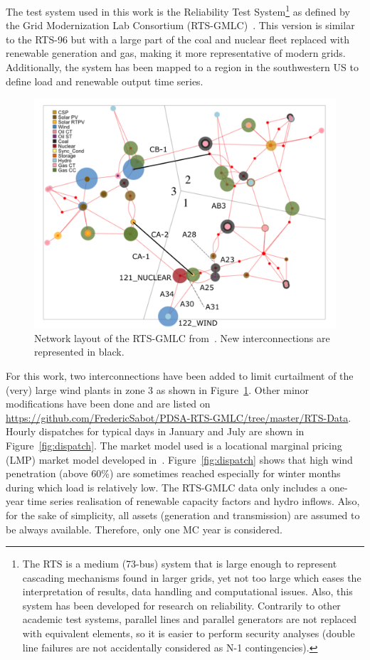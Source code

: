 The test system used in this work is the Reliability Test System\footnote{The RTS is a medium (73-bus) system that is large enough to represent cascading mechanisms found in larger grids, yet not too large which eases the interpretation of results, data handling and computational issues. Also, this system has been developed for research on reliability. Contrarily to other academic test systems, parallel lines and parallel generators are not replaced with equivalent elements, so it is easier to perform security analyses (double line failures are not accidentally considered as N-1 contingencies).} as defined by the Grid Modernization Lab Consortium (RTS-GMLC)~\cite{RTS-GMLC}. This version is similar to the RTS-96 but with a large part of the coal and nuclear fleet replaced with renewable generation and gas, making it more representative of modern grids. Additionally, the system has been mapped to a region in the southwestern US to define load and renewable output time series.

\begin{figure}
    \centering
    \includegraphics[width=0.8\linewidth]{Figs/RTS.png}
    \caption{Network layout of the RTS-GMLC from~\cite{RTS-GMLC}. New interconnections are represented in black.}
    \label{fig:RTS}
\end{figure}

For this work, two interconnections have been added to limit curtailment of the (very) large wind plants in zone 3 as shown in Figure~\ref{fig:RTS}. Other minor modifications have been done and are listed on \url{https://github.com/FredericSabot/PDSA-RTS-GMLC/tree/master/RTS-Data}. Hourly dispatches for typical days in January and July are shown in Figure~\ref{fig:dispatch}. The market model used is a locational marginal pricing (LMP) market model developed in~\cite{Prescient}. Figure~\ref{fig:dispatch} shows that high wind penetration (above 60\%) are sometimes reached especially for winter months during which load is relatively low. The RTS-GMLC data only includes a one-year time series realisation of renewable capacity factors and hydro inflows. Also, for the sake of simplicity, all assets (generation and transmission) are assumed to be always available. Therefore, only one MC year is considered.

